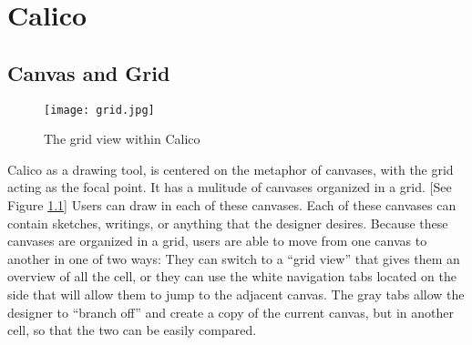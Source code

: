 \chapter{Calico}


\section{Canvas and Grid}

\begin{figure}[htb]
\centering
\texttt{[image: grid.jpg]}
\caption{The grid view within Calico}
\label{fig:grid}
\end{figure}

Calico as a drawing tool, is centered on the metaphor of canvases, with the grid acting as the focal point.
It has a mulitude of canvases organized in a grid. [See Figure \ref{fig:grid}]
Users can draw in each of these canvases.
Each of these canvases can contain sketches, writings, or anything that the designer desires.
Because these canvases are organized in a grid, users are able to move from one canvas to another in one of two ways: They can switch to a ``grid view'' that gives them an overview of all the cell, or they can use the white navigation tabs located on the side that will allow them to jump to the adjacent canvas.
The gray tabs allow the designer to ``branch off'' and create a copy of the current canvas, but in another cell, so that the two can be easily compared.

